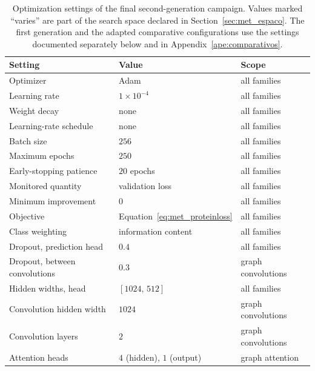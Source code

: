 \documentclass[Ingles]{ic-tese-v3}
\begin{document}
\begin{appendices}{}
\begin{table}[!htb]
  \centering
  \caption{Optimization settings of the final second-generation campaign. Values marked ``varies''
  are part of the search space declared in Section~\ref{sec:met_espaco}. The first generation and
  the adapted comparative configurations use the settings documented separately below and in
  Appendix~\ref{ape:comparativos}.}
  \label{tab:ape_hp}
  \begin{tabular}{lll}
    \hline
    \textbf{Setting} & \textbf{Value} & \textbf{Scope} \\
    \hline
    Optimizer                     & Adam                        & all families \\
    Learning rate                 & $1 \times 10^{-4}$          & all families \\
    Weight decay                  & none                        & all families \\
    Learning-rate schedule        & none                        & all families \\
    Batch size                    & $256$                       & all families \\
    Maximum epochs                & $250$                       & all families \\
    Early-stopping patience       & $20$ epochs                 & all families \\
    Monitored quantity            & validation loss             & all families \\
    Minimum improvement           & $0$                         & all families \\
    Objective                     & Equation~\eqref{eq:met_proteinloss} & all families \\
    Class weighting               & information content         & all families \\
    Dropout, prediction head      & $0.4$                       & all families \\
    Dropout, between convolutions & $0.3$                       & graph convolutions \\
    Hidden widths, head           & $[1024,\,512]$              & all families \\
    Convolution hidden width      & $1024$                      & graph convolutions \\
    Convolution layers            & $2$                         & graph convolutions \\
    Attention heads               & $4$ (hidden), $1$ (output)  & graph attention \\

\end{tabular}
\end{table}
\end{appendices}
\end{document}
